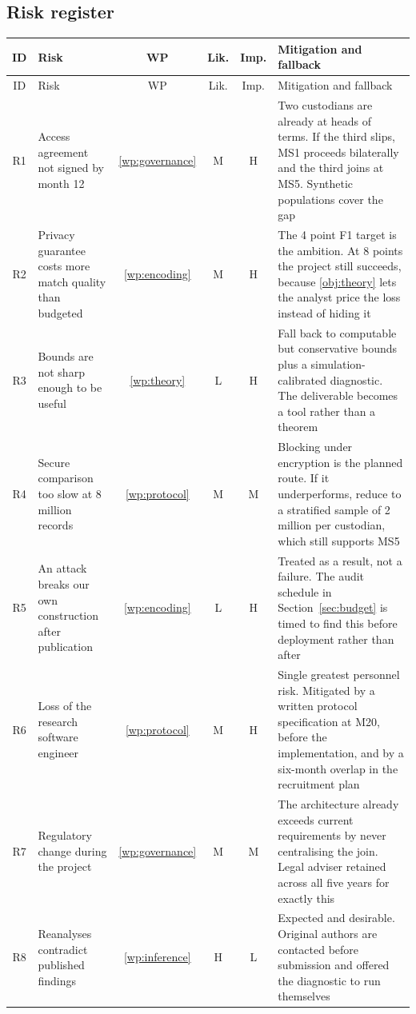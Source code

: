 \subsection{Risk register}

{\small
\begin{longtable}{@{}c L{4.2cm} c c c L{5.5cm}@{}}
  \toprule
  ID & Risk & WP & Lik. & Imp. & Mitigation and fallback \\
  \midrule
  \endfirsthead
  \toprule
  ID & Risk & WP & Lik. & Imp. & Mitigation and fallback \\
  \midrule
  \endhead
  \bottomrule
  \endfoot
  \bottomrule
  \endlastfoot
  R1 & Access agreement not signed by month 12 &
  \ref{wp:governance} & M & H &
  Two custodians are already at heads of terms. If the third slips, MS1 proceeds bilaterally and
  the third joins at MS5. Synthetic populations cover the gap \\
  \addlinespace
  R2 & Privacy guarantee costs more match quality than budgeted &
  \ref{wp:encoding} & M & H &
  The 4 point F1 target is the ambition. At 8 points the project still succeeds, because
  \ref{obj:theory} lets the analyst price the loss instead of hiding it \\
  \addlinespace
  R3 & Bounds are not sharp enough to be useful &
  \ref{wp:theory} & L & H &
  Fall back to computable but conservative bounds plus a simulation-calibrated diagnostic. The
  deliverable becomes a tool rather than a theorem \\
  \addlinespace
  R4 & Secure comparison too slow at 8 million records &
  \ref{wp:protocol} & M & M &
  Blocking under encryption is the planned route. If it underperforms, reduce to a stratified
  sample of 2 million per custodian, which still supports MS5 \\
  \addlinespace
  R5 & An attack breaks our own construction after publication &
  \ref{wp:encoding} & L & H &
  Treated as a result, not a failure. The audit schedule in Section~\ref{sec:budget} is timed to
  find this before deployment rather than after \\
  \addlinespace
  R6 & Loss of the research software engineer &
  \ref{wp:protocol} & M & H &
  Single greatest personnel risk. Mitigated by a written protocol specification at M20, before the
  implementation, and by a six-month overlap in the recruitment plan \\
  \addlinespace
  R7 & Regulatory change during the project &
  \ref{wp:governance} & M & M &
  The architecture already exceeds current requirements by never centralising the join. Legal
  adviser retained across all five years for exactly this \\
  \addlinespace
  R8 & Reanalyses contradict published findings &
  \ref{wp:inference} & H & L &
  Expected and desirable. Original authors are contacted before submission and offered the
  diagnostic to run themselves \\
\end{longtable}
}

